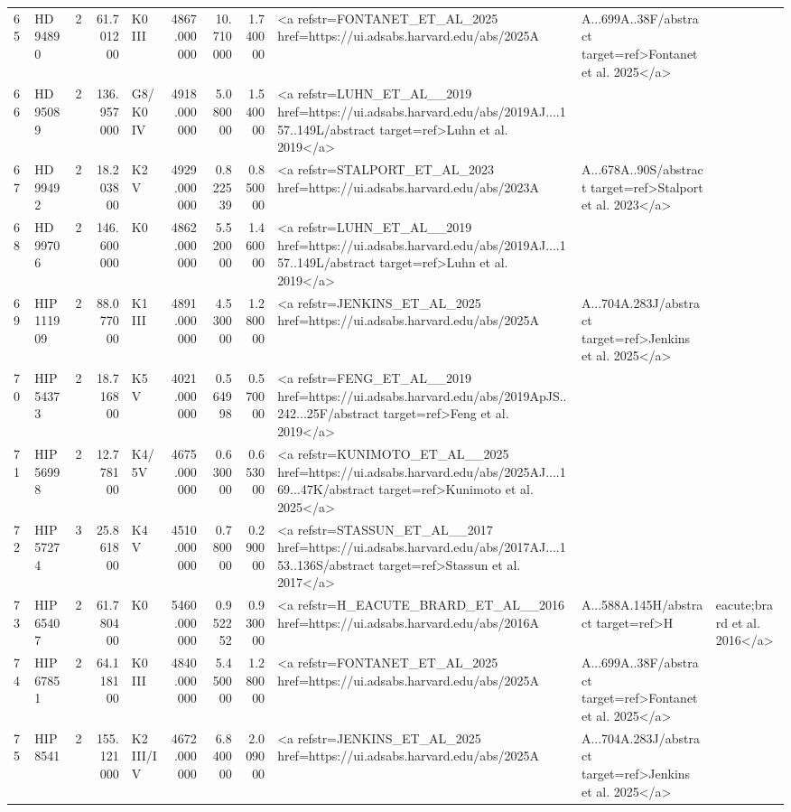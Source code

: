 \begin{tabular}{llrrlrrrl}
65 & HD 94890 & 2 & 61.701200 & K0 III & 4867.000000 & 10.710000 & 1.740000 & <a refstr=FONTANET_ET_AL_2025 href=https://ui.adsabs.harvard.edu/abs/2025A&A...699A..38F/abstract target=ref>Fontanet et al. 2025</a> \\
66 & HD 95089 & 2 & 136.957000 & G8/K0 IV & 4918.000000 & 5.080000 & 1.540000 & <a refstr=LUHN_ET_AL__2019 href=https://ui.adsabs.harvard.edu/abs/2019AJ....157..149L/abstract target=ref>Luhn et al. 2019</a> \\
67 & HD 99492 & 2 & 18.203800 & K2 V & 4929.000000 & 0.822539 & 0.850000 & <a refstr=STALPORT_ET_AL_2023 href=https://ui.adsabs.harvard.edu/abs/2023A&A...678A..90S/abstract target=ref>Stalport et al. 2023</a> \\
68 & HD 99706 & 2 & 146.600000 & K0 & 4862.000000 & 5.520000 & 1.460000 & <a refstr=LUHN_ET_AL__2019 href=https://ui.adsabs.harvard.edu/abs/2019AJ....157..149L/abstract target=ref>Luhn et al. 2019</a> \\
69 & HIP 111909 & 2 & 88.077000 & K1 III & 4891.000000 & 4.530000 & 1.280000 & <a refstr=JENKINS_ET_AL_2025 href=https://ui.adsabs.harvard.edu/abs/2025A&A...704A.283J/abstract target=ref>Jenkins et al. 2025</a> \\
70 & HIP 54373 & 2 & 18.716800 & K5 V & 4021.000000 & 0.564998 & 0.570000 & <a refstr=FENG_ET_AL__2019 href=https://ui.adsabs.harvard.edu/abs/2019ApJS..242...25F/abstract target=ref>Feng et al. 2019</a> \\
71 & HIP 56998 & 2 & 12.778100 & K4/5V & 4675.000000 & 0.630000 & 0.653000 & <a refstr=KUNIMOTO_ET_AL__2025 href=https://ui.adsabs.harvard.edu/abs/2025AJ....169...47K/abstract target=ref>Kunimoto et al. 2025</a> \\
72 & HIP 57274 & 3 & 25.861800 & K4 V & 4510.000000 & 0.780000 & 0.290000 & <a refstr=STASSUN_ET_AL__2017 href=https://ui.adsabs.harvard.edu/abs/2017AJ....153..136S/abstract target=ref>Stassun et al. 2017</a> \\
73 & HIP 65407 & 2 & 61.780400 & K0 & 5460.000000 & 0.952252 & 0.930000 & <a refstr=H_EACUTE_BRARD_ET_AL__2016 href=https://ui.adsabs.harvard.edu/abs/2016A&A...588A.145H/abstract target=ref>H&eacute;brard et al. 2016</a> \\
74 & HIP 67851 & 2 & 64.118100 & K0 III & 4840.000000 & 5.450000 & 1.280000 & <a refstr=FONTANET_ET_AL_2025 href=https://ui.adsabs.harvard.edu/abs/2025A&A...699A..38F/abstract target=ref>Fontanet et al. 2025</a> \\
75 & HIP 8541 & 2 & 155.121000 & K2 III/IV & 4672.000000 & 6.840000 & 2.009000 & <a refstr=JENKINS_ET_AL_2025 href=https://ui.adsabs.harvard.edu/abs/2025A&A...704A.283J/abstract target=ref>Jenkins et al. 2025</a> \\

\end{tabular}
